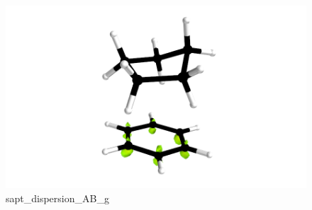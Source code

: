 \documentclass[11pt]{article}
\begin{document}
\begin{figure}
\centering
\includegraphics{Examples/benzcyclo_excite/sapt_density_AB_eg.png}
\caption{sapt\_dispersion\_AB\_g}
\end{figure}

    


    
    
    
\end{document}
